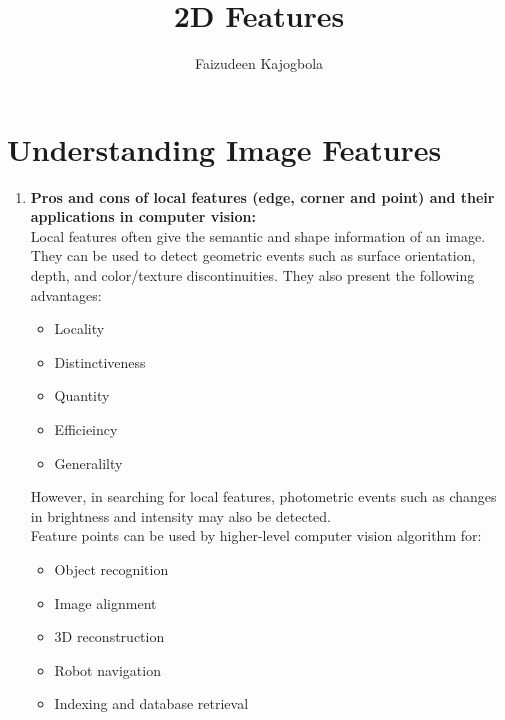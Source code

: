 \documentclass[a4paper]{article}
\title{\Huge{2D Features}}
\author{Faizudeen Kajogbola}
\date{} %
\begin{document}
\maketitle

\setlength{\headsep}{5pt}


\section{Understanding Image Features}

\begin{enumerate}

        \item \textbf{Pros and cons of local features (edge, corner and point) and
         their applications in computer vision:} \\
        Local features often give the semantic and shape information of an image. 
        They can be used to detect geometric events such as surface orientation, depth, and color/texture discontinuities. 
        They also present the following advantages:
        \begin{itemize}
                \item Locality
                \item Distinctiveness
                \item Quantity
                \item Efficieincy
                \item Generalilty 
        \end{itemize}
        However, in searching for local features, photometric events  such as changes in brightness and intensity may also be detected. \\

        Feature points can be used by higher-level computer vision algorithm for:
        \begin{itemize}
                \item Object recognition
                \item Image alignment
                \item 3D reconstruction
                \item Robot navigation
                \item Indexing and database retrieval
        \end{itemize}


\end{enumerate}
\end{document}
